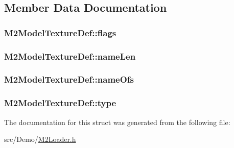 \subsection{Member Data Documentation}
\hypertarget{struct_m2_model_texture_def_a8c5d43fe326de69d4c6efe75657cac98}{
\subsubsection[{flags}]{ M2\+Model\+Texture\+Def\+::flags}}\label{struct_m2_model_texture_def_a8c5d43fe326de69d4c6efe75657cac98}
\hypertarget{struct_m2_model_texture_def_a5a829c126f9f7c6b01d2bc7cb1c5cbcd}{
\subsubsection[{name\+Len}]{ M2\+Model\+Texture\+Def\+::name\+Len}}\label{struct_m2_model_texture_def_a5a829c126f9f7c6b01d2bc7cb1c5cbcd}
\hypertarget{struct_m2_model_texture_def_a51d3ceb83a5abdcb14928f18f040485e}{
\subsubsection[{name\+Ofs}]{ M2\+Model\+Texture\+Def\+::name\+Ofs}}\label{struct_m2_model_texture_def_a51d3ceb83a5abdcb14928f18f040485e}
\hypertarget{struct_m2_model_texture_def_a48a9a4170fdcaf77f4f3d4d6bc911496}{
\subsubsection[{type}]{ M2\+Model\+Texture\+Def\+::type}}\label{struct_m2_model_texture_def_a48a9a4170fdcaf77f4f3d4d6bc911496}


The documentation for this struct was generated from the following file\+:\begin{DoxyCompactItemize}
\item 
src/\+Demo/\hyperlink{_m2_loader_8h}{M2\+Loader.\+h}\end{DoxyCompactItemize}
